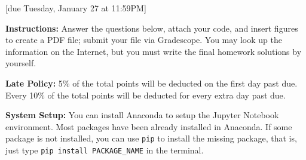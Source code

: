 \documentclass{article}
\begin{document}
[due Tuesday, January 27 at 11:59PM]

\textbf{Instructions:} Answer the questions below, attach your code, and insert figures to create a PDF file; submit your file via Gradescope. You may look up the information on the Internet, but you must write the final homework solutions by yourself.

\textbf{Late Policy:} 5\% of the total points will be deducted on the first day past due. Every 10\% of the total points will be deducted for every extra day past due.

\textbf{System Setup:} You can install Anaconda to setup the Jupyter Notebook environment. Most packages have been already installed in Anaconda. If some package is not installed, you can use \texttt{pip} to install the missing package, that is, just type \texttt{pip install PACKAGE\_NAME} in the terminal.
\end{document}
